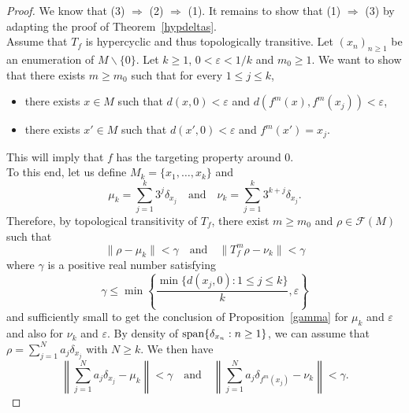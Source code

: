 \documentclass[12pt,english]{amsart}
\numberwithin{equation}{section}
\theoremstyle{plain}
\theoremstyle{definition}
\def\sp{\hbox{{\rm span}}}
\begin{document}
\begin{proof}
We know that  (3) $\Rightarrow$ (2) $\Rightarrow$ (1). It remains to show that (1) $\Rightarrow$ (3) by adapting the proof of Theorem~\ref{hypdeltas}.\\

Assume that $T_f$ is hypercyclic and thus topologically transitive. Let $(x_n)_{n\ge 1}$ be an enumeration of $M\backslash\{0\}$.
Let $k\ge 1$, $0<\varepsilon<1/k$ and $m_0\ge 1$. We want to show that there exists $m\ge m_0$ such that for every $1\le j\le k$, 
\begin{itemize}
\item there exists $x\in M$ such that $d(x,0)<\varepsilon$  and $d(f^m(x),f^m(x_j))<\varepsilon$,
\item there exists $x'\in M$ such that $d(x',0)<\varepsilon$ and $f^m(x')=x_j$.
\end{itemize}
This will imply that $f$ has the targeting property around $0$.\\

To this end, let us define $M_k=\{x_1,\dots,x_k\}$ and
\[\mu_k=\sum_{j=1}^k 3^j\delta_{x_j} \quad \text{and}\quad \nu_k=\sum_{j=1}^k 3^{k+j}\delta_{x_j}.\]
Therefore, by topological transitivity of $T_f$, there exist $m\ge m_0$ and $\rho\in \mathcal{F}(M)$ such that 
\[\|\rho-\mu_k\|<\gamma \quad \text{and}\quad \|T_f^m\rho-\nu_k\|<\gamma\]
where $\gamma$ is a positive real number satisfying
\[\gamma\le\min\left\{\frac{\min\{d(x_j,0):1\le j\le k\}}{k},\varepsilon\right\}\]
and sufficiently small to get the conclusion of Proposition~\ref{gamma} for $\mu_k$ and $\varepsilon$ and also for $\nu_k$ and $\varepsilon$. 
By density of $\sp\{\delta_{x_n}: n\ge 1\}$, we can assume that $\rho=\sum_{j=1}^N a_j  \delta_{x_j}$ with $N\ge k$. We then have
\[\left\|\sum_{j=1}^N a_j \delta_{x_j}-\mu_k\right\|<\gamma \quad \text{and}\quad \left\|\sum_{j=1}^N a_j \delta_{f^m(x_j)}-\nu_k\right\|<\gamma.\]


\end{proof}
\end{document}
